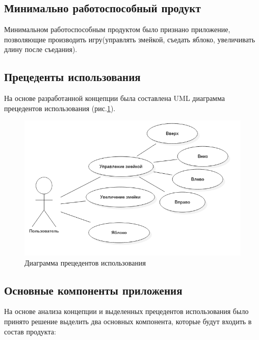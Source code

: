 	\subsection{Минимально работоспособный продукт}
	
	Минимальном работоспособным продуктом было признано приложение, позволяющие производить игру(управлять змейкой, съедать яблоко, увеличивать длину после съедания). 
	
	\subsection{Прецеденты использования}
	
	На основе разработанной концепции была составлена UML диаграмма прецедентов использования (рис.\ref{pic:use_case}).
	
	\begin{figure}[H]
		\begin{center}
		\begin{minipage}[h]{0.49\linewidth}
			\includegraphics[width=1\textwidth]{../image/UseCases.png}
			\caption{Диаграмма прецедентов использования}
			\label{pic:use_case}
		\end{minipage}
	\end{center}
	\end{figure}
	
	\subsection{Основные компоненты приложения}
	
	На основе анализа концепции и выделенных прецедентов использования было принято решение выделить два основных компонента, которые будут входить в состав продукта:
	
